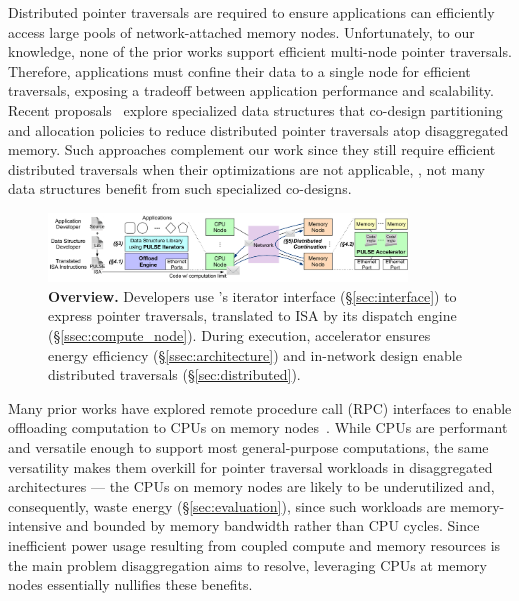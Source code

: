  Distributed pointer traversals are required to ensure applications can efficiently access large pools of network-attached memory nodes. Unfortunately, to our knowledge, none of the prior works support efficient multi-node pointer traversals. Therefore, applications must confine their data to a single node for efficient traversals, exposing a tradeoff between application performance and scalability. Recent proposals~\cite{sherman, clover, fusee, rolex, marlin, sephash, ditto} explore specialized data structures that co-design partitioning and allocation policies to reduce distributed pointer traversals atop disaggregated memory. Such approaches complement our work since they still require efficient distributed traversals when their optimizations are not applicable, \eg, not many data structures benefit from such specialized co-designs. 

\begin{figure}[ht!]
  \centering
  \includegraphics[width=0.85\textwidth]{fig/pulse/overview.pdf}
  \vspace{-1em}
  \caption[\pulse Overview]{\textbf{\pulse Overview.} Developers use \pulse's iterator interface (\S\ref{sec:interface}) to express pointer traversals, translated to \pulse ISA by its dispatch engine (\S\ref{ssec:compute_node}). During execution, \pulse accelerator ensures energy efficiency (\S\ref{ssec:architecture}) and in-network design enable distributed traversals (\S\ref{sec:distributed}).} 
  \label{fig:general}\vspace{-1em}
\end{figure}

 Many prior works have explored remote procedure call (RPC) interfaces to enable offloading computation to CPUs on memory nodes~\cite{aifm, kayak_nsdi_21, splinter, storagefunctions, storm_systor_19}. While CPUs are performant and versatile enough to support most general-purpose computations, the same versatility makes them overkill for pointer traversal workloads in disaggregated architectures --- the CPUs on memory nodes are likely to be underutilized and, consequently, waste energy (\S\ref{sec:evaluation}), since such workloads are memory-intensive and bounded by memory bandwidth rather than CPU cycles. 
Since inefficient power usage resulting from coupled compute and memory resources is the main problem disaggregation aims to resolve, leveraging CPUs at memory nodes essentially nullifies these benefits. 

